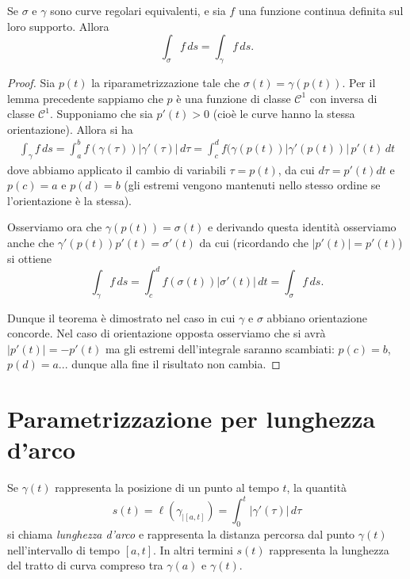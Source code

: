 \documentclass[italian,a4paper]{scrartcl}
\newcommand{\C}{{\mathcal C}}
\begin{document}
\begin{theorem}
Se $\sigma$ e $\gamma$ sono curve regolari equivalenti, e sia $f$ una
funzione continua definita sul loro supporto. Allora
\[
 \int_\sigma f \, ds = \int_\gamma f \, ds.
\]
\end{theorem}

\begin{proof}
Sia $p(t)$ la riparametrizzazione tale che 
$\sigma(t) =
\gamma(p(t))$. Per il lemma precedente sappiamo che $p$ è una funzione
di classe $\C^1$ con inversa di classe $\C^1$. Supponiamo che sia
$p'(t)>0$ (cioè le curve hanno la stessa orientazione). Allora si ha
\begin{align*}
\int_\gamma f\, ds = \int_a^b f(\gamma(\tau)) \lvert \gamma'(\tau)\rvert\, d\tau
= \int_c^d f(\gamma(p(t)) \lvert \gamma'(p(t))\rvert\,
p'(t)\, dt
\end{align*}
dove abbiamo applicato il cambio di variabili $\tau = p(t)$, da cui
$d\tau = p'(t) dt$ e $p(c)=a$ e $p(d)=b$ (gli estremi vengono
mantenuti nello stesso ordine se l'orientazione è la stessa).

Osserviamo ora che $\gamma(p(t)) = \sigma(t)$ e derivando questa
identità osserviamo anche che $\gamma'(p(t))p'(t) = \sigma'(t)$ da cui
(ricordando che $\lvert p'(t)\rvert = p'(t)$) si ottiene
\[
  \int_\gamma f\, ds = \int_c^d f(\sigma(t)) \lvert \sigma'(t)\rvert\,
  dt
  = \int_\sigma f\, ds.
\]

Dunque il teorema è dimostrato nel caso in cui $\gamma$ e $\sigma$
abbiano orientazione concorde. Nel caso di orientazione opposta
osserviamo che si avrà $\lvert p'(t)\rvert = - p'(t)$ ma gli estremi
dell'integrale saranno scambiati: $p(c)=b$, $p(d)=a$... dunque alla
fine il risultato non cambia.
\end{proof}

\section{Parametrizzazione per lunghezza d'arco}

Se $\gamma(t)$ rappresenta la posizione di un punto al tempo $t$, la
quantità
$$
s(t) =  \ell(\gamma_{|[a,t]}) = \int_0^t |\gamma'(\tau)|\, d\tau
$$
si chiama \emph{lunghezza d'arco} e
rappresenta la distanza percorsa dal punto $\gamma(t)$ nell'intervallo
di tempo $[a,t]$. In altri termini $s(t)$ rappresenta la lunghezza del
tratto di curva compreso tra $\gamma(a)$ e $\gamma(t)$. 
\end{document}
